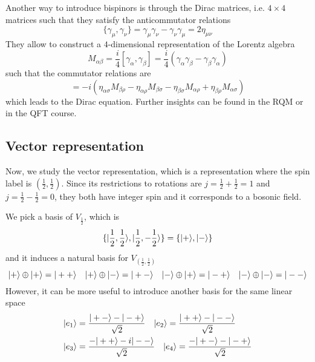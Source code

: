     Another way to introduce bispinors is through the Dirac matrices, i.e. $4 \times 4$ matrices such that they satisfy the anticommutator relations 
    \begin{equation*}
        \{\gamma_\mu, \gamma_\nu\} = \gamma_\mu \gamma_\nu - \gamma_\nu \gamma_\mu = 2 \eta_{\mu\nu}
    \end{equation*}
    They allow to construct a $4$-dimensional representation of the Lorentz algebra 
    \begin{equation*}
        M_{\alpha\beta} = \frac{i}{4} [\gamma_\alpha, \gamma_\beta] = \frac{i}{4} (\gamma_\alpha \gamma_\beta - \gamma_\beta \gamma_\alpha)
    \end{equation*}
    such that the commutator relations are
    \begin{equation*}
        [M_{\alpha\beta}, M_{\sigma\rho}] = - i (\eta_{\alpha\sigma} M_{\beta \rho} - \eta_{\alpha\rho} M_{\beta\sigma} - \eta_{\beta\sigma} M_{\alpha\rho} + \eta_{\beta\rho} M_{\alpha\sigma})
    \end{equation*}
    which leads to the Dirac equation. Further insights can be found in the RQM or in the QFT course.

\subsection{Vector representation}

    Now, we study the vector representation, which is a representation where the spin label is $(\frac{1}{2}, \frac{1}{2})$. Since its restrictions to rotations are $j = \frac{1}{2} + \frac{1}{2} = 1$ and $j = \frac{1}{2} - \frac{1}{2} = 0$, they both have integer spin and it corresponds to a bosonic field. 
    
    We pick a basis of $V_{\frac{1}{2}}$, which is 
    \begin{equation*}
        \{\vert\frac{1}{2}, \frac{1}{2}\rangle, \vert\frac{1}{2}, -\frac{1}{2}\rangle\} = \{\vert+\rangle, \vert-\rangle\}
    \end{equation*} 
    and it induces a natural basis for $V_{(\frac{1}{2}, \frac{1}{2})}$ 
    \begin{equation*}
        \vert+\rangle \oplus \vert+\rangle = \vert++\rangle \quad \vert+\rangle \oplus \vert-\rangle = \vert+-\rangle \quad \vert-\rangle \oplus \vert+\rangle = \vert-+\rangle \quad \vert-\rangle \oplus \vert-\rangle = \vert--\rangle
    \end{equation*}
    However, it can be more useful to introduce another basis for the same linear space
    \begin{equation*}
    \begin{aligned}
        & \vert e_1\rangle = \frac{\vert+-\rangle - \vert-+\rangle}{\sqrt 2} \quad \vert e_2\rangle = \frac{\vert++\rangle - \vert--\rangle}{\sqrt 2} \\ & \vert e_3\rangle = \frac{- \vert++\rangle - i\vert--\rangle}{\sqrt 2} \quad \vert e_4\rangle = \frac{- \vert+-\rangle - \vert-+\rangle}{\sqrt 2}
    \end{aligned}
    \end{equation*}

